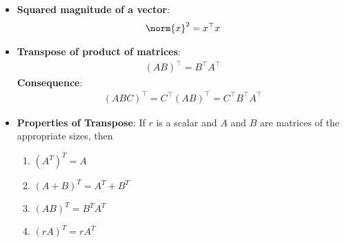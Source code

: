 \documentclass{report}
\begin{document}
    \pagebreak 
    \begin{itemize}
        \item \textbf{Squared magnitude of a vector}:  
            \begin{align*}
                \norm{x}^{2} = x^{\top}x
            \end{align*}
        \item \textbf{Transpose of product of matrices}:
            \begin{align*}
                (AB)^{\top} = B^{\top}A^{\top}
            \end{align*}
            \bigbreak \noindent 
            \textbf{Consequence}:
            \begin{align*}
                (ABC)^{\top} = C^{\top}(AB)^{\top} = C^{\top}B^{\top}A^{\top}
            \end{align*}
        \item \textbf{Properties of Transpose}:
            If \( r \) is a scalar and \( A \) and \( B \) are matrices of the appropriate sizes, then
            \begin{enumerate}
                \item \( (A^T)^T = A \)
                \item \( (A + B)^T = A^T + B^T \)
                \item \( (AB)^T = B^T A^T \)
                \item \( (rA)^T = rA^T \)
            \end{enumerate}



    \end{itemize}
\end{document}
